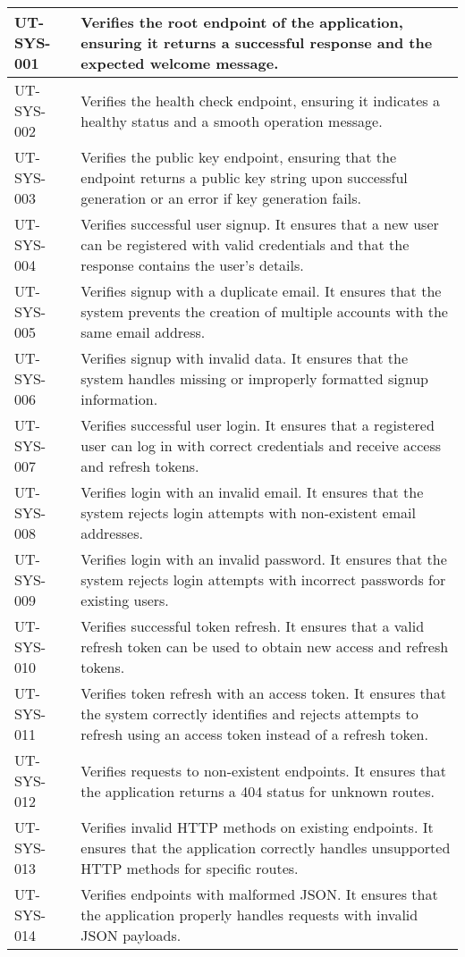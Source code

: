 \begin{longtable}{|p{}|p{}|}
UT-SYS-001 & Verifies the root endpoint of the application, ensuring it returns a successful response and the expected welcome message. \\
\hline
UT-SYS-002 & Verifies the health check endpoint, ensuring it indicates a healthy status and a smooth operation message. \\
\hline
UT-SYS-003 & Verifies the public key endpoint, ensuring that the endpoint returns a public key string upon successful generation or an error if key generation fails. \\
\hline
UT-SYS-004 & Verifies successful user signup. It ensures that a new user can be registered with valid credentials and that the response contains the user's details. \\
\hline
UT-SYS-005 & Verifies signup with a duplicate email. It ensures that the system prevents the creation of multiple accounts with the same email address. \\
\hline
UT-SYS-006 & Verifies signup with invalid data. It ensures that the system handles missing or improperly formatted signup information. \\
\hline
UT-SYS-007 & Verifies successful user login. It ensures that a registered user can log in with correct credentials and receive access and refresh tokens. \\
\hline
UT-SYS-008 & Verifies login with an invalid email. It ensures that the system rejects login attempts with non-existent email addresses. \\
\hline
UT-SYS-009 & Verifies login with an invalid password. It ensures that the system rejects login attempts with incorrect passwords for existing users. \\
\hline
UT-SYS-010 & Verifies successful token refresh. It ensures that a valid refresh token can be used to obtain new access and refresh tokens. \\
\hline
UT-SYS-011 & Verifies token refresh with an access token. It ensures that the system correctly identifies and rejects attempts to refresh using an access token instead of a refresh token. \\
\hline
UT-SYS-012 & Verifies requests to non-existent endpoints. It ensures that the application returns a 404 status for unknown routes. \\
\hline
UT-SYS-013 & Verifies invalid HTTP methods on existing endpoints. It ensures that the application correctly handles unsupported HTTP methods for specific routes. \\
\hline
UT-SYS-014 & Verifies endpoints with malformed JSON. It ensures that the application properly handles requests with invalid JSON payloads. \\

\end{longtable}
